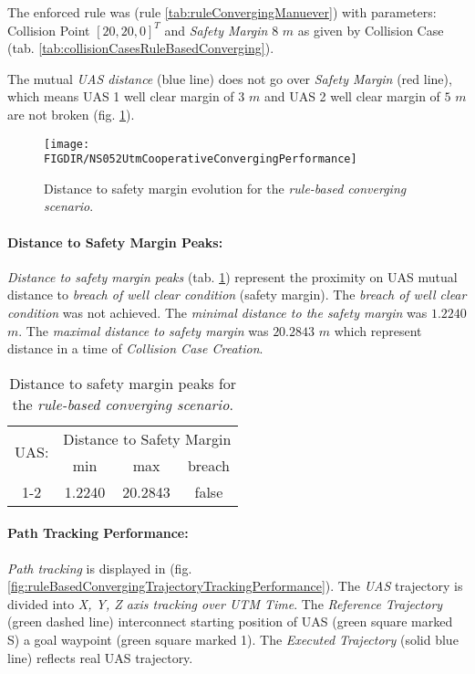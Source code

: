 The enforced rule was (rule \ref{tab:ruleConvergingManuever}) with parameters: Collision Point $[20,20,0]^T$ and \emph{Safety Margin} $8$ $m$ as given by Collision Case (tab. \ref{tab:collisionCasesRuleBasedConverging}).

The mutual \emph{UAS distance} (blue line) does not go over \emph{Safety Margin} (red line), which means UAS 1 well clear margin of $3$ $m$ and UAS 2 well clear margin of $5$ $m$ are not broken (fig. \ref{fig:testCaseRuleBasedConvergingAvoidancePerformance}).

\begin{figure}[H]
    \centering
    \texttt{[image: \\FIGDIR/NS052UtmCooperativeConvergingPerformance]} 
    \caption{Distance to safety margin evolution for the \emph{rule-based converging scenario}.}
    \label{fig:testCaseRuleBasedConvergingAvoidancePerformance}
\end{figure}


\paragraph{Distance to Safety Margin Peaks:} \emph{Distance to safety margin peaks} (tab. \ref{tab:testCaseRuleBasedConvergingSafetyMarginDistances}) represent the proximity on UAS mutual distance to \emph{breach of well clear condition} (safety margin). The \emph{breach of well clear condition} was not achieved. The \emph{minimal distance to the safety margin} was $1.2240$ $m$. The \emph{maximal distance to safety margin} was $20.2843$ $m$ which represent distance in a time of \emph{Collision Case Creation}.

\begin{table}[H]
    \centering
    \begin{tabular}{c||c|c|c}
        \multirow{2}{*}{UAS:} & \multicolumn{3}{c}{Distance to Safety Margin} \\ \cline{2-4} 
                  & min          & max         & breach         \\ \hline\hline
            1-2   & 1.2240       & 20.2843     & false          \\ 
    \end{tabular}
    \caption{Distance to safety margin peaks for the \emph{rule-based converging scenario}.}
    \label{tab:testCaseRuleBasedConvergingSafetyMarginDistances}
\end{table}

\paragraph{Path Tracking Performance:} \emph{Path tracking} is displayed in (fig. \ref{fig:ruleBasedConvergingTrajectoryTrackingPerformance}). The \emph{UAS} trajectory is divided into \emph{X, Y, Z axis tracking over UTM Time}. The \emph{Reference Trajectory} (green dashed line) interconnect starting position of UAS (green square marked S) a goal waypoint (green square marked 1). The \emph{Executed Trajectory} (solid blue line) reflects real UAS trajectory. 


